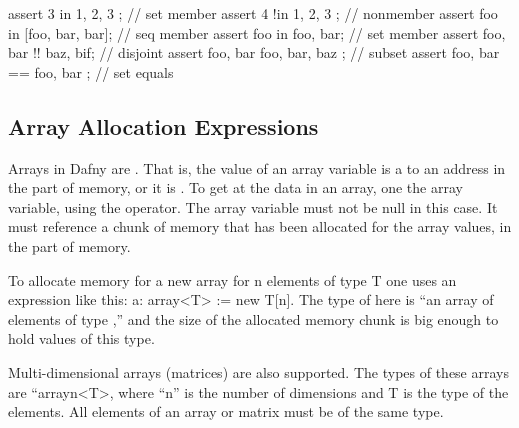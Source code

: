 \documentclass[letterpaper,10pt,english]{sphinxmanual}
\begin{document}
\begin{sphinxVerbatim}[commandchars=\\\{\}]
assert 3 in \PYGZob{} 1, 2, 3 \PYGZcb{};                            // set member
assert 4 !in \PYGZob{} 1, 2, 3 \PYGZcb{};                           // non\PYGZhy{}member
assert \PYGZdq{}foo\PYGZdq{} in [\PYGZdq{}foo\PYGZdq{}, \PYGZdq{}bar\PYGZdq{}, \PYGZdq{}bar\PYGZdq{}];              // seq member
assert \PYGZdq{}foo\PYGZdq{} in \PYGZob{} \PYGZdq{}foo\PYGZdq{}, \PYGZdq{}bar\PYGZdq{}\PYGZcb{};                    // set member
assert \PYGZob{} \PYGZdq{}foo\PYGZdq{}, \PYGZdq{}bar\PYGZdq{} \PYGZcb{} !! \PYGZob{} \PYGZdq{}baz\PYGZdq{}, \PYGZdq{}bif\PYGZdq{}\PYGZcb{};         // disjoint
assert \PYGZob{} \PYGZdq{}foo\PYGZdq{}, \PYGZdq{}bar\PYGZdq{} \PYGZcb{} \PYGZlt{} \PYGZob{} \PYGZdq{}foo\PYGZdq{}, \PYGZdq{}bar\PYGZdq{}, \PYGZdq{}baz\PYGZdq{} \PYGZcb{};  // subset
assert \PYGZob{} \PYGZdq{}foo\PYGZdq{}, \PYGZdq{}bar\PYGZdq{} \PYGZcb{} == \PYGZob{} \PYGZdq{}foo\PYGZdq{}, \PYGZdq{}bar\PYGZdq{} \PYGZcb{};        // set equals
\end{sphinxVerbatim}


\subsection{Array Allocation Expressions}
\label{\detokenize{06-dafny-language:array-allocation-expressions}}
Arrays in Dafny are . That is, the value
of an array variable is a  to an address in the
 part of memory, or it is . To get at the data
in an array, one  the array variable, using
the  operator. The array variable must not be
null in this case. It must reference a chunk of memory that
has been allocated for the array values, in the  part
of memory.

To allocate memory for a new array for n elements of type T one
uses an expression like this: a: array\textless{}T\textgreater{} := new T{[}n{]}. The type
of  here is “an array of elements of type ,” and the size
of the allocated memory chunk is big enough to hold  values
of this type.

Multi-dimensional arrays (matrices) are also supported. The types of
these arrays are “arrayn\textless{}T\textgreater{}, where “n” is the number of dimensions and
T is the type of the elements. All elements of an array or matrix must
be of the same type.
\end{document}
